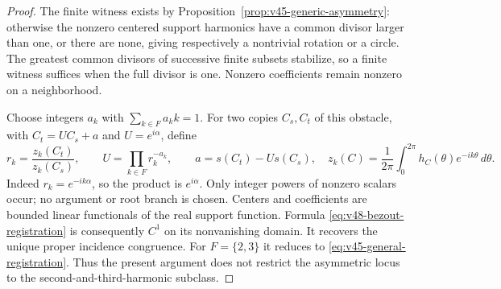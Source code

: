 \begin{proof}
The finite witness exists by
Proposition~\ref{prop:v45-generic-asymmetry}: otherwise the nonzero
centered support harmonics have a common divisor larger than one, or
there are none, giving respectively a nontrivial rotation or a circle.
The greatest common divisors of successive finite subsets stabilize,
so a finite witness suffices when the full divisor is one.  Nonzero
coefficients remain nonzero on a neighborhood.

Choose integers $a_k$ with $\sum_{k\in F}a_kk=1$.  For two copies
$C_s,C_t$ of this obstacle, with $C_t=UC_s+a$ and
$U=e^{i\alpha}$, define
\begin{equation}\label{eq:v48-bezout-registration}
 r_k=\frac{z_k(C_t)}{z_k(C_s)},\qquad
 U=\prod_{k\in F}r_k^{-a_k},\qquad
 a=s(C_t)-Us(C_s),
 \quad z_k(C)=\frac1{2\pi}\int_0^{2\pi}h_C(\theta)e^{-ik\theta}\,d\theta.
\end{equation}
Indeed $r_k=e^{-ik\alpha}$, so the product is $e^{i\alpha}$.
Only integer powers of nonzero scalars occur; no argument or root
branch is chosen.  Centers and coefficients are bounded linear
functionals of the real support function.  Formula
\eqref{eq:v48-bezout-registration} is consequently $C^1$ on its
nonvanishing domain.  It recovers the unique proper incidence
congruence.  For $F=\{2,3\}$ it reduces to
\eqref{eq:v45-general-registration}.  Thus the present argument does
not restrict the asymmetric locus to the second-and-third-harmonic
subclass.


\end{proof}
